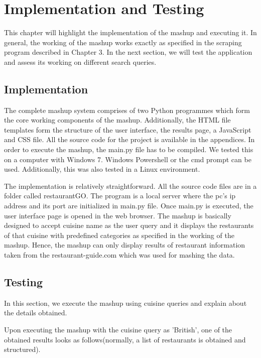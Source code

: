 \chapter{Implementation and Testing}
This chapter will highlight the implementation of the mashup and executing it. In general, the working of the mashup works exactly as specified in the scraping program described in Chapter 3. In the next section, we will test the application and assess its working on different search queries.

\section{Implementation}
The complete mashup system comprises of two Python programmes which form the core working components of the mashup. Additionally, the HTML file templates form the structure of the user interface, the results page, a JavaScript and CSS file. All the source code for the project is available in the appendices. In order to execute the mashup, the main.py file has to be compiled. We tested this on a computer with Windows 7.  Windows Powershell or the cmd prompt can be used. Additionally, this was also tested in a Linux environment.

The implementation is relatively straightforward. All the source code files are in a folder called restaurantGO. The program is a local server where the pc’s ip address and its port are initialized in main.py file. Once main.py is executed, the user interface page is opened in the web browser. The mashup is basically designed to accept cuisine name as the user query and it displays the restaurants of that cuisine with predefined categories as specified in the working of the mashup. Hence, the mashup can only display results of restaurant information taken from the restaurant-guide.com which was used for mashing the data.

\section{Testing}

In this section, we execute the mashup using cuisine queries and explain about the details obtained.

Upon executing the mashup with the cuisine query as 'British', one of the obtained results looks as follows(normally, a list of restaurants is obtained and structured).

